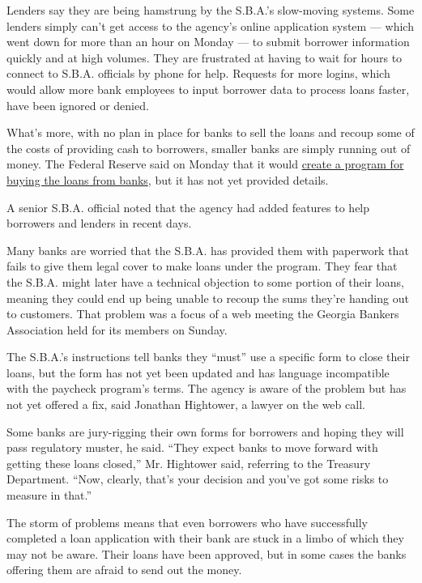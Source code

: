 Lenders say they are being hamstrung by the S.B.A.'s slow-moving
systems. Some lenders simply can't get access to the agency's online
application system --- which went down for more than an hour on Monday
--- to submit borrower information quickly and at high volumes. They are
frustrated at having to wait for hours to connect to S.B.A. officials by
phone for help. Requests for more logins, which would allow more bank
employees to input borrower data to process loans faster, have been
ignored or denied.

What's more, with no plan in place for banks to sell the loans and
recoup some of the costs of providing cash to borrowers, smaller banks
are simply running out of money. The Federal Reserve said on Monday that
it would
\href{https://www.nytimes.com/2020/04/06/business/economy/federal-reserve-small-business-loans.html}{create
a program for buying the loans from banks}, but it has not yet provided
details.

A senior S.B.A. official noted that the agency had added features to
help borrowers and lenders in recent days.

Many banks are worried that the S.B.A. has provided them with paperwork
that fails to give them legal cover to make loans under the program.
They fear that the S.B.A. might later have a technical objection to some
portion of their loans, meaning they could end up being unable to recoup
the sums they're handing out to customers. That problem was a focus of a
web meeting the Georgia Bankers Association held for its members on
Sunday.

The S.B.A.'s instructions tell banks they ``must'' use a specific form
to close their loans, but the form has not yet been updated and has
language incompatible with the paycheck program's terms. The agency is
aware of the problem but has not yet offered a fix, said Jonathan
Hightower, a lawyer on the web call.

Some banks are jury-rigging their own forms for borrowers and hoping
they will pass regulatory muster, he said. ``They expect banks to move
forward with getting these loans closed,'' Mr. Hightower said, referring
to the Treasury Department. ``Now, clearly, that's your decision and
you've got some risks to measure in that.''

The storm of problems means that even borrowers who have successfully
completed a loan application with their bank are stuck in a limbo of
which they may not be aware. Their loans have been approved, but in some
cases the banks offering them are afraid to send out the money.

